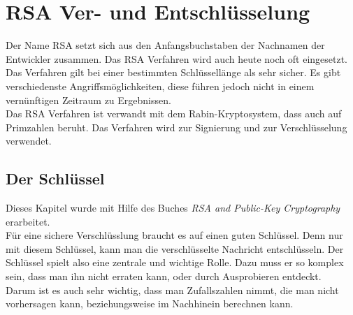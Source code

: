 \newpage
\section{RSA Ver- und Entschlüsselung}
Der Name RSA setzt sich aus den Anfangsbuchstaben der Nachnamen der Entwickler zusammen. Das RSA Verfahren wird auch heute noch oft eingesetzt. Das Verfahren gilt bei einer bestimmten Schlüssellänge als sehr sicher. Es gibt verschiedenste Angriffsmöglichkeiten, diese führen jedoch nicht in einem vernünftigen Zeitraum zu Ergebnissen.\\
Das RSA Verfahren ist verwandt mit dem Rabin-Kryptosystem, dass auch auf Primzahlen beruht. Das Verfahren wird zur Signierung und zur Verschlüsselung verwendet. %

\subsection{Der Schlüssel}
Dieses Kapitel wurde mit Hilfe des Buches \textit{RSA and Public-Key Cryptography} erarbeitet.\\[2ex]
%
Für eine sichere Verschlüsslung braucht es auf einen guten Schlüssel. Denn nur mit diesem Schlüssel, kann man die verschlüsselte Nachricht entschlüsseln. Der Schlüssel spielt also eine zentrale und wichtige Rolle. Dazu muss er so komplex sein, dass man ihn nicht erraten kann, oder durch Ausprobieren entdeckt.\\
Darum ist es auch sehr wichtig, dass man Zufallszahlen nimmt, die man nicht vorhersagen kann, beziehungsweise im Nachhinein berechnen kann.
%
